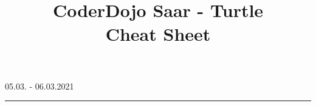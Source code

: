 

\title{CoderDojo Saar - Turtle\\\textbf{Cheat Sheet}}




    \maketitle
   
    \begin{center}
        \vspace{-1.5em}
        05.03. - 06.03.2021
        \rule{\textwidth}{1pt}
    \end{center}

 